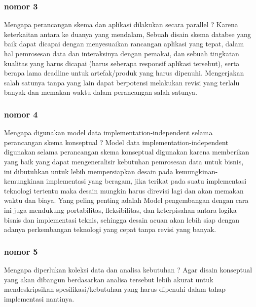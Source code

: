 \documentclass{article}
\begin{document}
\subsubsection*{nomor 3}
Mengapa perancangan skema dan aplikasi dilakukan secara parallel ?
\bigbreak
Karena keterkaitan antara ke duanya yang mendalam,
Sebuah disain skema databse yang baik dapat dicapai dengan menyesuaikan rancangan  aplikasi yang tepat, dalam hal pemrosesan data dan interaksinya dengan pemakai, dan sebuah tingkatan kualitas yang harus dicapai (harus seberapa responsif aplikasi tersebut), serta berapa lama deadline untuk artefak/produk yang harus dipenuhi. 
Mengerjakan salah satunya tanpa yang lain dapat berpotensi melakukan revisi yang terlalu banyak dan memakan waktu dalam perancangan salah satunya. 

\subsubsection*{nomor 4}
Mengapa digunakan model data implementation-independent selama perancangan skema konseptual ? 
\bigbreak
Model data implementation-independent digunakan selama perancangan skema konseptual digunakan karena memberikan yang baik yang dapat mengeneralisir kebutuhan pemrosesan data untuk  bisnis, ini dibutuhkan untuk lebih mempersiapkan desain pada kemungkinan-kemungkinan implementasi yang beragam, jika terikat pada suatu implementasi teknologi tertentu maka desain mungkin harus direvisi lagi dan akan memakan waktu dan biaya. Yang peling penting adalah Model pengembangan dengan cara ini juga mendukung portabilitas, fleksibilitas, dan keterpisahan antara logika bisnis dan implementasi teknis, sehingga desain acuan akan lebih siap dengan adanya perkembangan teknologi yang cepat tanpa revisi yang banyak. 

\subsubsection*{nomor 5}
Mengapa diperlukan koleksi data dan analisa kebutuhan ?
\bigbreak
Agar disain konseptual  yang akan dibangun berdasarkan analisa tersebut lebih akurat untuk mendeskripsikan spesifikasi/kebutuhan yang harus dipenuhi dalam tahap implementasi nantinya.
\end{document}
